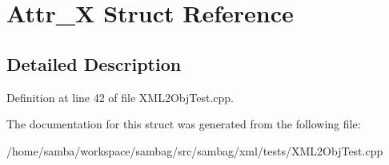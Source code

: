 \hypertarget{struct_attr___x}{
\section{Attr\_\-X Struct Reference}
\label{struct_attr___x}
}


\subsection{Detailed Description}


Definition at line 42 of file XML2ObjTest.cpp.



The documentation for this struct was generated from the following file:\begin{DoxyCompactItemize}
\item 
/home/samba/workspace/sambag/src/sambag/xml/tests/XML2ObjTest.cpp\end{DoxyCompactItemize}
